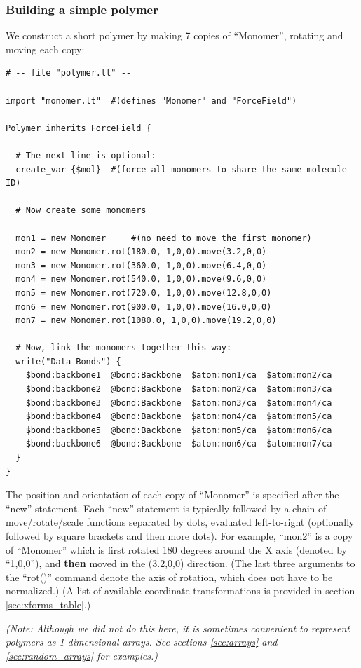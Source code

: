 \documentclass[11pt]{article}
\begin{document}
\subsubsection*{Building a simple polymer}
We construct a short polymer by making 7 copies of ``Monomer'',
rotating and moving each copy:
\label{sec:2beadPolymer}
\begin{verbatim}
# -- file "polymer.lt" --

import "monomer.lt"  #(defines "Monomer" and "ForceField")

Polymer inherits ForceField {

  # The next line is optional:
  create_var {$mol}  #(force all monomers to share the same molecule-ID)

  # Now create some monomers

  mon1 = new Monomer     #(no need to move the first monomer)
  mon2 = new Monomer.rot(180.0, 1,0,0).move(3.2,0,0)
  mon3 = new Monomer.rot(360.0, 1,0,0).move(6.4,0,0)
  mon4 = new Monomer.rot(540.0, 1,0,0).move(9.6,0,0)
  mon5 = new Monomer.rot(720.0, 1,0,0).move(12.8,0,0)
  mon6 = new Monomer.rot(900.0, 1,0,0).move(16.0,0,0)
  mon7 = new Monomer.rot(1080.0, 1,0,0).move(19.2,0,0)

  # Now, link the monomers together this way:
  write("Data Bonds") {
    $bond:backbone1  @bond:Backbone  $atom:mon1/ca  $atom:mon2/ca
    $bond:backbone2  @bond:Backbone  $atom:mon2/ca  $atom:mon3/ca
    $bond:backbone3  @bond:Backbone  $atom:mon3/ca  $atom:mon4/ca
    $bond:backbone4  @bond:Backbone  $atom:mon4/ca  $atom:mon5/ca
    $bond:backbone5  @bond:Backbone  $atom:mon5/ca  $atom:mon6/ca
    $bond:backbone6  @bond:Backbone  $atom:mon6/ca  $atom:mon7/ca
  }
}
\end{verbatim}
The position and orientation of each copy of ``Monomer'' 
is specified after the ``new'' statement. 
Each ``new'' statement is typically followed by a chain of 
move/rotate/scale functions separated by dots, evaluated left-to-right
(optionally followed by square brackets and then more dots). 
For example, ``mon2'' is a copy of ``Monomer'' which is first rotated 
180 degrees around the X axis (denoted by ``1,0,0''), 
and \textbf{then} moved in the (3.2,0,0) direction.
(The last three arguments to the ``rot()'' command 
 denote the axis of rotation, which does not have to be normalized.)
(A list of available coordinate transformations 
is provided in section \ref{sec:xforms_table}.)

\textit{(Note: Although we did not do this here, 
it is sometimes convenient to represent polymers as 1-dimensional arrays. 
See sections \ref{sec:arrays} and \ref{sec:random_arrays} for examples.)}
\end{document}
